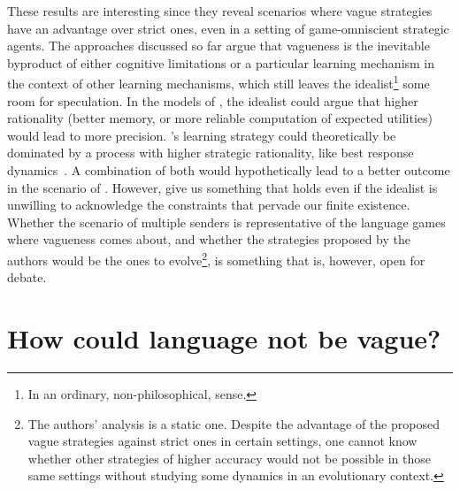 \documentclass[a4paper]{article}
\begin{document}
These results are interesting since they reveal scenarios where vague strategies have an advantage over strict ones, even in a setting of game-omniscient strategic agents.
The approaches discussed so far argue that vagueness is the inevitable byproduct of either cognitive limitations or a particular learning mechanism in the context of other learning mechanisms, which still leaves the idealist\footnote{In an ordinary, non-philosophical, sense.} some room for speculation.
In the models of \citeauthor{franke_vagueness_2011}, the idealist could argue that higher rationality (better memory, or more reliable computation of expected utilities) would lead to more precision.
\citeauthor{oconnor_evolving_2015}'s learning strategy could theoretically be dominated by a process with higher strategic rationality, like best response dynamics~\parencite{gilboa_social_1991}.
A combination of both would hypothetically lead to a better outcome in the scenario of \citeauthor{franke_vagueness_2017}.
However, \citeauthor{lawry_vagueness_2017} give us something that holds even if the idealist is unwilling to acknowledge the constraints that pervade our finite existence.
Whether the scenario of multiple senders is representative of the language games where vagueness comes about, and whether the strategies proposed by the authors would be the ones to evolve\footnote{The authors' analysis is a static one. Despite the advantage of the proposed vague strategies against strict ones in certain settings, one cannot know whether other strategies of higher accuracy would not be possible in those same settings without studying some dynamics in an evolutionary context.}, is something that is, however, open for debate.


\section{How could language not be vague?}
\label{sec:finite-experience}
\end{document}
